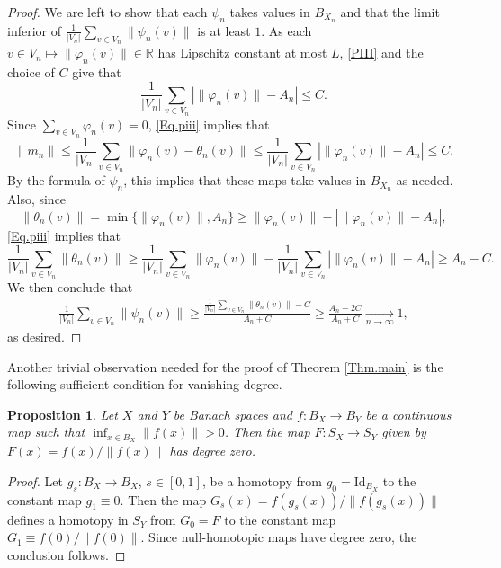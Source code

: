 \documentclass[11pt]{amsart}
\newtheorem{proposition}[theorem]{Proposition}
\theoremstyle{definition}
\theoremstyle{remark}
\begin{document}
\begin{proof}
We are left to show that each $\psi_n$ takes values in $B_{X_n}$ and that the limit inferior of  $\tfrac{1}{|V_n|}\sum_{v\in V_n}\|\psi_n(v)\|$  is at least $1$.  As each $v\in V_n\mapsto \|\varphi_n(v)\|\in \mathbb{R}$ has Lipschitz constant at most $L$, \eqref{PIII} and the choice of $C$ give that 
\begin{equation}\label{Eq.piii}
    \frac{1}{|V_n|}\sum_{v\in V_n}\left|\|\varphi_n(v)\|-A_n\right|\leq C.
\end{equation}
Since $\sum_{v\in V_n}\varphi_n(v)=0$, \eqref{Eq.piii} implies that
\begin{equation*}
    \|m_n\|\leq\frac{1}{|V_n|}\sum_{v\in V_n}\|\varphi_n(v)-\theta_n(v)\|\leq \frac{1}{|V_n|}\sum_{v\in V_n}|\|\varphi_n(v)\|-A_n|\leq C.
\end{equation*}
By the formula of $\psi_n$, this  implies that these maps take values in $B_{X_n}$ as needed.
Also, since 
\[\|\theta_n(v)\|=\min\{\|\varphi_n(v)\|,A_n\}\geq \|\varphi_n(v)\|-|\|\varphi_n(v)\|-A_n|,\]
 \eqref{Eq.piii}  implies that
\begin{equation*}
    \frac{1}{|V_n|}\sum_{v\in V_n}\|\theta_n(v)\|\geq     \frac{1}{|V_n|}\sum_{v\in V_n}\|\varphi_n(v)\|-    \frac{1}{|V_n|}\sum_{v\in V_n}|\|\varphi_n(v)\|-A_n|\geq A_n-C.
\end{equation*}
We then conclude that 
\begin{align*}
     \frac{1}{|V_n|}\sum_{v\in V_n}\|\psi_n(v)\|\geq \frac{\frac{1}{|V_n|}\sum_{v\in V_n}\|\theta_n(v)\|-C}{A_n+C}\geq \frac{A_n-2C}{A_n+C}\underset{n\to \infty}{\longrightarrow}1,
\end{align*}
as desired.
\end{proof}
 
Another trivial observation needed for the proof of Theorem \ref{Thm.main} is the following sufficient condition for vanishing degree.

\begin{proposition}\label{Prop.null.homotopy}
    Let $X$ and $Y$ be Banach spaces and $f\colon B_X\to B_Y$ be a continuous map such that $\inf_{x\in B_X}\|f(x)\|>0$. Then the map $F\colon S_X\to S_Y$ given by $F(x)=f(x)/\|f(x)\|$ has degree zero.
\end{proposition}
 
\begin{proof}
Let $g_s\colon B_X\to B_X$, $s\in [0,1]$, be a homotopy from $g_0=\mathrm{Id}_{B_X}$ to the constant map $g_1\equiv 0$. Then the map $G_s(x)=f(g_s(x))/\|f(g_s(x))\|$ defines a homotopy in $S_Y$ from $G_0=F$ to the constant map $G_1\equiv f(0)/\|f(0)\|$. Since null-homotopic maps have degree zero, the conclusion follows.
\end{proof}
 
\end{document}
